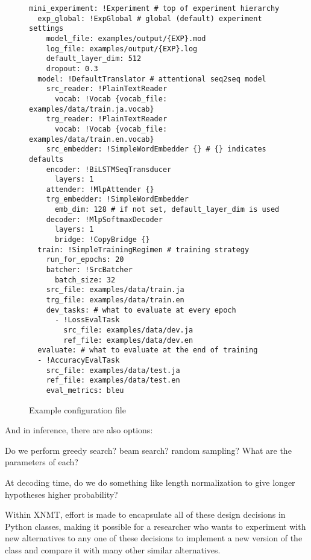 \documentclass[]{article}
\begin{document}
\begin{figure}[t!]
\centering
  \begin{verbatim}
mini_experiment: !Experiment # top of experiment hierarchy
  exp_global: !ExpGlobal # global (default) experiment settings
    model_file: examples/output/{EXP}.mod
    log_file: examples/output/{EXP}.log
    default_layer_dim: 512
    dropout: 0.3
  model: !DefaultTranslator # attentional seq2seq model
    src_reader: !PlainTextReader
      vocab: !Vocab {vocab_file: examples/data/train.ja.vocab}
    trg_reader: !PlainTextReader
      vocab: !Vocab {vocab_file: examples/data/train.en.vocab}
    src_embedder: !SimpleWordEmbedder {} # {} indicates defaults
    encoder: !BiLSTMSeqTransducer
      layers: 1
    attender: !MlpAttender {}
    trg_embedder: !SimpleWordEmbedder
      emb_dim: 128 # if not set, default_layer_dim is used
    decoder: !MlpSoftmaxDecoder
      layers: 1
      bridge: !CopyBridge {}
  train: !SimpleTrainingRegimen # training strategy
    run_for_epochs: 20
    batcher: !SrcBatcher
      batch_size: 32
    src_file: examples/data/train.ja
    trg_file: examples/data/train.en
    dev_tasks: # what to evaluate at every epoch
      - !LossEvalTask
        src_file: examples/data/dev.ja
        ref_file: examples/data/dev.en
  evaluate: # what to evaluate at the end of training
  - !AccuracyEvalTask
    src_file: examples/data/test.ja
    ref_file: examples/data/test.en
    eval_metrics: bleu
\end{verbatim}
\vspace{-6mm}
\caption{Example configuration file \label{yaml_example_1}}
\end{figure}

\noindent
And in inference, there are also options:
\begin{description}
\setlength{\itemsep}{0.5pt}
\item[Search Strategy:] Do we perform greedy search? beam search? random sampling? What are the parameters of each?
\item[Decoding Time Score Adjustment:] At decoding time, do we do something like length normalization to give longer hypotheses higher probability?
\end{description}

Within XNMT, effort is made to encapsulate all of these design decisions in Python classes, making it possible for a researcher who wants to experiment with new alternatives to any one of these decisions to implement a new version of the class and compare it with many other similar alternatives.
\end{document}
